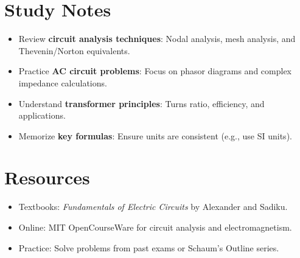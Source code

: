\documentclass[12pt]{article}
\begin{document}
\section{Study Notes}
\begin{itemize}
    \item Review \textbf{circuit analysis techniques}: Nodal analysis, mesh analysis, and Thevenin/Norton equivalents.
    \item Practice \textbf{AC circuit problems}: Focus on phasor diagrams and complex impedance calculations.
    \item Understand \textbf{transformer principles}: Turns ratio, efficiency, and applications.
    \item Memorize \textbf{key formulas}: Ensure units are consistent (e.g., use SI units).
\end{itemize}

\section{Resources}
\begin{itemize}
    \item Textbooks: \textit{Fundamentals of Electric Circuits} by Alexander and Sadiku.
    \item Online: MIT OpenCourseWare for circuit analysis and electromagnetism.
    \item Practice: Solve problems from past exams or Schaum's Outline series.
\end{itemize}
\end{document}
